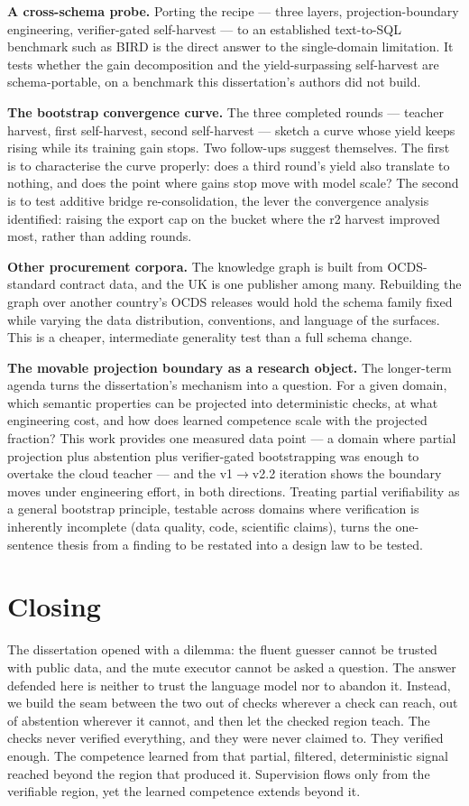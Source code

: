\textbf{A cross-schema probe.} Porting the recipe --- three layers, projection-boundary engineering, verifier-gated self-harvest --- to an established text-to-SQL benchmark such as BIRD is the direct answer to the single-domain limitation. It tests whether the gain decomposition and the yield-surpassing self-harvest are schema-portable, on a benchmark this dissertation's authors did not build.

\textbf{The bootstrap convergence curve.} The three completed rounds --- teacher harvest, first self-harvest, second self-harvest --- sketch a curve whose yield keeps rising while its training gain stops. Two follow-ups suggest themselves. The first is to characterise the curve properly: does a third round's yield also translate to nothing, and does the point where gains stop move with model scale? The second is to test additive bridge re-consolidation, the lever the convergence analysis identified: raising the export cap on the bucket where the r2 harvest improved most, rather than adding rounds.

\textbf{Other procurement corpora.} The knowledge graph is built from OCDS-standard contract data, and the UK is one publisher among many. Rebuilding the graph over another country's OCDS releases would hold the schema family fixed while varying the data distribution, conventions, and language of the surfaces. This is a cheaper, intermediate generality test than a full schema change.

\textbf{The movable projection boundary as a research object.} The longer-term agenda turns the dissertation's mechanism into a question. For a given domain, which semantic properties can be projected into deterministic checks, at what engineering cost, and how does learned competence scale with the projected fraction? This work provides one measured data point --- a domain where partial projection plus abstention plus verifier-gated bootstrapping was enough to overtake the cloud teacher --- and the v1$\rightarrow$v2.2 iteration shows the boundary moves under engineering effort, in both directions. Treating partial verifiability as a general bootstrap principle, testable across domains where verification is inherently incomplete (data quality, code, scientific claims), turns the one-sentence thesis from a finding to be restated into a design law to be tested.

\section{Closing}\label{sec:closing}

The dissertation opened with a dilemma: the fluent guesser cannot be trusted with public data, and the mute executor cannot be asked a question. The answer defended here is neither to trust the language model nor to abandon it. Instead, we build the seam between the two out of checks wherever a check can reach, out of abstention wherever it cannot, and then let the checked region teach. The checks never verified everything, and they were never claimed to. They verified enough. The competence learned from that partial, filtered, deterministic signal reached beyond the region that produced it. Supervision flows only from the verifiable region, yet the learned competence extends beyond it.
